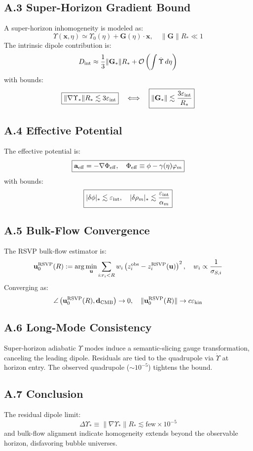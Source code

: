 \documentclass{article}
\begin{document}
{{\subsection{A.3 Super-Horizon Gradient Bound}
A super-horizon inhomogeneity is modeled as:
\[
\Upsilon(\mathbf{x},\eta) \simeq \Upsilon_0(\eta) + \mathbf{G}(\eta) \cdot \mathbf{x}, \quad \|\mathbf{G}\| R_* \ll 1
\]
The intrinsic dipole contribution is:
\[
D_{\rm int} \approx \frac{1}{3} \|\mathbf{G}_*\| R_* + \mathcal{O}\left( \int \dot{\Upsilon} \, d\eta \right)
\]
with bounds:
\[
\boxed{\|\nabla \Upsilon_*\| R_* \lesssim 3 \varepsilon_{\rm int}} \quad \Longleftrightarrow \quad \boxed{\|\mathbf{G}_*\| \lesssim \frac{3 \varepsilon_{\rm int}}{R_*}}
\]

\subsection{A.4 Effective Potential}
The effective potential is:
\[
\boxed{\mathbf{a}_{\rm eff} = -\nabla \Phi_{\rm eff}, \quad \Phi_{\rm eff} \equiv \phi - \gamma(\eta) \varphi_m}
\]
with bounds:
\[
\boxed{|\delta\phi|_* \lesssim \varepsilon_{\rm int}, \quad |\delta\rho_m|_* \lesssim \frac{\varepsilon_{\rm int}}{\alpha_m}}
\]

\subsection{A.5 Bulk-Flow Convergence}
The RSVP bulk-flow estimator is:
\[
\mathbf{u}_0^{\rm RSVP}(R) := \arg\min_{\mathbf{u}} \sum_{i: r_i < R} w_i \left( z_i^{\rm obs} - z_i^{\rm RSVP}(\mathbf{u}) \right)^2, \quad w_i \propto \frac{1}{\sigma_{S,i}}
\]
Converging as:
\[
\angle \left( \mathbf{u}_0^{\rm RSVP}(R), \mathbf{d}_{\rm CMB} \right) \to 0, \quad \|\mathbf{u}_0^{\rm RSVP}(R)\| \to c \varepsilon_{\rm kin}
\]

\subsection{A.6 Long-Mode Consistency}
Super-horizon adiabatic \(\Upsilon\) modes induce a semantic-slicing gauge transformation, canceling the leading dipole. Residuals are tied to the quadrupole via \(\dot{\Upsilon}\) at horizon entry. The observed quadrupole (\(\sim 10^{-5}\)) tightens the bound.

\subsection{A.7 Conclusion}
The residual dipole limit:
\[
\Delta \Upsilon_* \equiv \|\nabla \Upsilon_*\| R_* \lesssim \text{few} \times 10^{-5}
\]
and bulk-flow alignment indicate homogeneity extends beyond the observable horizon, disfavoring bubble universes.

}}
\end{document}
